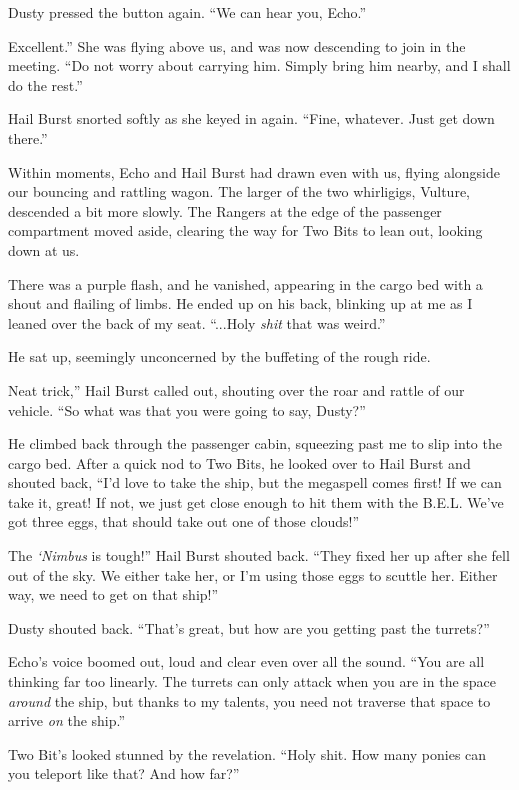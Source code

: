 Dusty pressed the button again. “We can hear you, Echo.”

\leavevmode{}Excellent.” She was flying above us, and was now descending to join in the meeting. “Do not worry about carrying him. Simply bring him nearby, and I shall do the rest.”

Hail Burst snorted softly as she keyed in again. “Fine, whatever. Just get down there.”

Within moments, Echo and Hail Burst had drawn even with us, flying alongside our bouncing and rattling wagon. The larger of the two whirligigs, Vulture, descended a bit more slowly. The Rangers at the edge of the passenger compartment moved aside, clearing the way for Two Bits to lean out, looking down at us.

There was a purple flash, and he vanished, appearing in the cargo bed with a shout and flailing of limbs. He ended up on his back, blinking up at me as I leaned over the back of my seat. “...Holy \textit{shit} that was weird.”

He sat up, seemingly unconcerned by the buffeting of the rough ride.

\leavevmode{}Neat trick,” Hail Burst called out, shouting over the roar and rattle of our vehicle. “So what was that you were going to say, Dusty?”

He climbed back through the passenger cabin, squeezing past me to slip into the cargo bed. After a quick nod to Two Bits, he looked over to Hail Burst and shouted back, “I’d love to take the ship, but the megaspell comes first! If we can take it, great! If not, we just get close enough to hit them with the B.E.L. We’ve got three eggs, that should take out one of those clouds!”

\leavevmode{}The \textit{‘Nimbus} is tough!” Hail Burst shouted back. “They fixed her up after she fell out of the sky. We either take her, or I’m using those eggs to scuttle her. Either way, we need to get on that ship!”

Dusty shouted back. “That’s great, but how are you getting past the turrets?”

Echo’s voice boomed out, loud and clear even over all the sound. “You are all thinking far too linearly. The turrets can only attack when you are in the space \textit{around} the ship, but thanks to my talents, you need not traverse that space to arrive \textit{on} the ship.”

Two Bit’s looked stunned by the revelation. “Holy shit. How many ponies can you teleport like that? And how far?”

